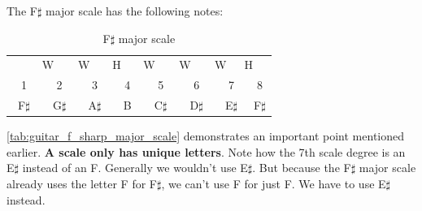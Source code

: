 The F$\sharp$ major scale has the following notes:

\begin{table}[h]
	\centering
	\begin{tabular}{*{16}{c}}
		& \multicolumn{2}{P{4mm}}{\large{W}} & \multicolumn{2}{P{4mm}}{\large{W}} & \multicolumn{2}{P{4mm}}{\large{H}} & \multicolumn{2}{P{4mm}}{\large{W}} & \multicolumn{2}{P{4mm}}{\large{W}} & \multicolumn{2}{P{4mm}}{\large{W}} & \multicolumn{2}{P{4mm}}{\large{H}} & \\
		\multicolumn{2}{P{4mm}}{1} & \multicolumn{2}{P{4mm}}{2} & \multicolumn{2}{P{4mm}}{3} & \multicolumn{2}{P{4mm}}{4} & \multicolumn{2}{P{4mm}}{5} & \multicolumn{2}{P{4mm}}{6} & \multicolumn{2}{P{4mm}}{7} & \multicolumn{2}{P{4mm}}{8} \\
		\multicolumn{2}{P{4mm}}{F$\sharp$} & \multicolumn{2}{P{4mm}}{G$\sharp$} & \multicolumn{2}{P{4mm}}{A$\sharp$} & \multicolumn{2}{P{4mm}}{B} & \multicolumn{2}{P{4mm}}{C$\sharp$} & \multicolumn{2}{P{4mm}}{D$\sharp$} & \multicolumn{2}{P{4mm}}{E$\sharp$} & \multicolumn{2}{P{4mm}}{F$\sharp$}
	\end{tabular}
	\caption{F$\sharp$ major scale}
	\label{tab:guitar_f_sharp_major_scale}
\end{table}

\autoref{tab:guitar_f_sharp_major_scale} demonstrates an important point mentioned earlier. \textbf{A scale only has unique letters}. Note how the 7th scale degree is an E$\sharp$ instead of an F. Generally we wouldn't use E$\sharp$. But because the F$\sharp$ major scale already uses the letter F for F$\sharp$, we can't use F for just F. We have to use E$\sharp$ instead.

